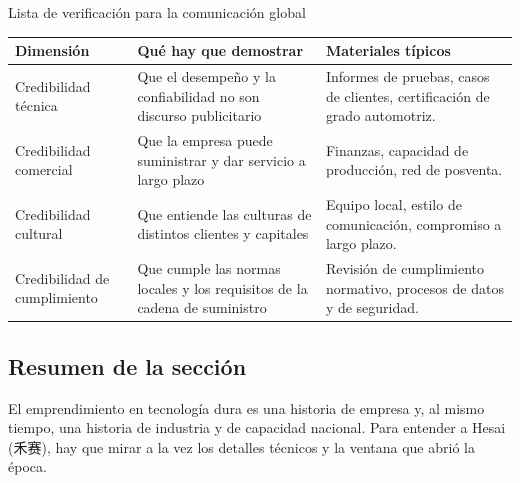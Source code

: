 \begin{knowledgebox}{Lista de verificación para la comunicación global}
\begin{tabularx}{\textwidth}{p{}p{}X}
\toprule
Dimensión & Qué hay que demostrar & Materiales típicos \\
\midrule
Credibilidad técnica & Que el desempeño y la confiabilidad no son discurso publicitario & Informes de pruebas, casos de clientes, certificación de grado automotriz. \\
Credibilidad comercial & Que la empresa puede suministrar y dar servicio a largo plazo & Finanzas, capacidad de producción, red de posventa. \\
Credibilidad cultural & Que entiende las culturas de distintos clientes y capitales & Equipo local, estilo de comunicación, compromiso a largo plazo. \\
Credibilidad de cumplimiento & Que cumple las normas locales y los requisitos de la cadena de suministro & Revisión de cumplimiento normativo, procesos de datos y de seguridad. \\
\bottomrule
\end{tabularx}
\end{knowledgebox}

\subsection{Resumen de la sección}

El emprendimiento en tecnología dura es una historia de empresa y, al mismo tiempo, una historia de industria y de capacidad nacional. Para entender a Hesai (禾赛), hay que mirar a la vez los detalles técnicos y la ventana que abrió la época.
